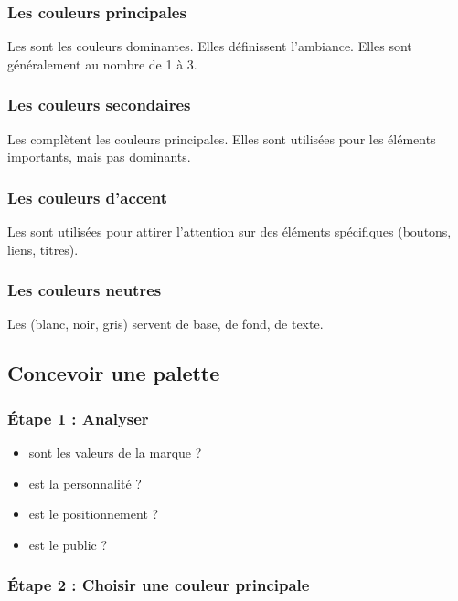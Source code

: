 \subsubsection{Les couleurs principales}

Les  sont les couleurs dominantes. Elles définissent l'ambiance. Elles sont généralement au nombre de 1 à 3.

\subsubsection{Les couleurs secondaires}

Les  complètent les couleurs principales. Elles sont utilisées pour les éléments importants, mais pas dominants.

\subsubsection{Les couleurs d'accent}

Les  sont utilisées pour attirer l'attention sur des éléments spécifiques (boutons, liens, titres).

\subsubsection{Les couleurs neutres}

Les  (blanc, noir, gris) servent de base, de fond, de texte.

\subsection{Concevoir une palette}

\subsubsection{Étape 1 : Analyser}

\begin{itemize}
    \item {} sont les valeurs de la marque ?
    \item {} est la personnalité ?
    \item {} est le positionnement ?
    \item {} est le public ?
\end{itemize}

\subsubsection{Étape 2 : Choisir une couleur principale}

